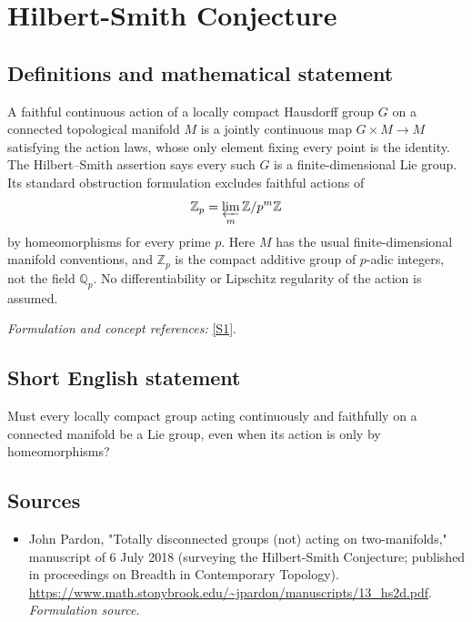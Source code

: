 \documentclass[11pt]{article}
\begin{document}
\section*{\texorpdfstring{Hilbert-Smith Conjecture}{Hilbert-Smith Conjecture}}\label{1482}
\subsection{Definitions and mathematical statement}
A faithful continuous action of a locally compact Hausdorff group $G$ on a connected topological manifold $M$ is a jointly continuous map $G\times M\to M$ satisfying the action laws, whose only element fixing every point is the identity. The Hilbert--Smith assertion says every such $G$ is a finite-dimensional Lie group. Its standard obstruction formulation excludes faithful actions of
\[
 {\mathbb{Z}}_p=\varprojlim_m{\mathbb{Z}}/p^m{\mathbb{Z}}
\]
by homeomorphisms for every prime $p$. Here $M$ has the usual finite-dimensional manifold conventions, and ${\mathbb{Z}}_p$ is the compact additive group of $p$-adic integers, not the field ${\mathbb{Q}}_p$. No differentiability or Lipschitz regularity of the action is assumed.
\par\smallskip\textit{Formulation and concept references:} \href{https://www.math.stonybrook.edu/~jpardon/manuscripts/13_hs2d.pdf}{[S1]}.

\subsection{Short English statement}
Must every locally compact group acting continuously and faithfully on a connected manifold be a Lie group, even when its action is only by homeomorphisms?
\subsection{Sources}
\begin{itemize}
\item[S1]John Pardon, "Totally disconnected groups (not) acting on two-manifolds," manuscript of 6 July 2018 (surveying the Hilbert-Smith Conjecture; published in proceedings on Breadth in Contemporary Topology).
\url{https://www.math.stonybrook.edu/~jpardon/manuscripts/13_hs2d.pdf}.
\textit{Formulation source.}
\end{itemize}
\end{document}
